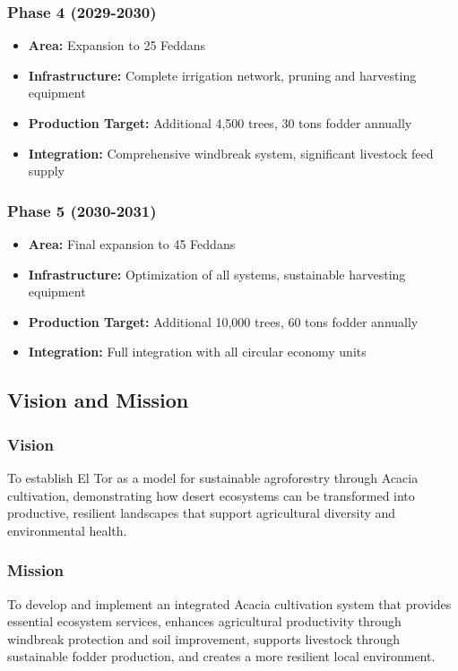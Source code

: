 \subsubsection{Phase 4 (2029-2030)}
\begin{itemize}
    \item \textbf{Area:} Expansion to 25 Feddans
    \item \textbf{Infrastructure:} Complete irrigation network, pruning and harvesting equipment
    \item \textbf{Production Target:} Additional 4,500 trees, 30 tons fodder annually
    \item \textbf{Integration:} Comprehensive windbreak system, significant livestock feed supply
\end{itemize}

\subsubsection{Phase 5 (2030-2031)}
\begin{itemize}
    \item \textbf{Area:} Final expansion to 45 Feddans
    \item \textbf{Infrastructure:} Optimization of all systems, sustainable harvesting equipment
    \item \textbf{Production Target:} Additional 10,000 trees, 60 tons fodder annually
    \item \textbf{Integration:} Full integration with all circular economy units
\end{itemize}

\subsection{Vision and Mission}

\subsubsection{Vision}
To establish El Tor as a model for sustainable agroforestry through Acacia cultivation, demonstrating how desert ecosystems can be transformed into productive, resilient landscapes that support agricultural diversity and environmental health.

\subsubsection{Mission}
To develop and implement an integrated Acacia cultivation system that provides essential ecosystem services, enhances agricultural productivity through windbreak protection and soil improvement, supports livestock through sustainable fodder production, and creates a more resilient local environment.

